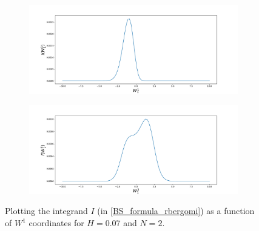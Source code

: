 \documentclass[11pt]{article}
\begin{document}
 
 \begin{figure}[h!]
 	\centering
 	\begin{subfigure}{.4\textwidth}
 		\centering
 		\includegraphics[width=1\linewidth]{./figures/integrand_plotting_rBergomi/1D_plots/N_2/H_007/Bergomi_integrand_K_1_H_007_W11_N_2}
 		\caption{}
 		\label{fig:sub3}
 	\end{subfigure}%
 	\begin{subfigure}{.4\textwidth}
 		\centering
 		\includegraphics[width=1\linewidth]{./figures/integrand_plotting_rBergomi/1D_plots/N_2/H_007/Bergomi_integrand_K_1_H_007_W12_N_2}
 		\caption{}
 		\label{fig:sub4}
 	\end{subfigure}
 	\caption{Plotting the integrand $I$ (in \eqref{BS_formula_rbergomi}) as a function of $W^1$ coordinates for $H=0.07$ and $N=2$.}
 	\label{fig:Integrand_H_007_N_2_W_1}
 \end{figure}
 
\end{document}
